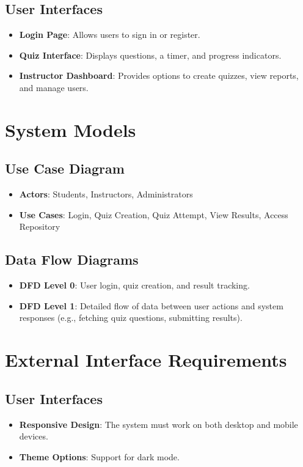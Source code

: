 \documentclass{article}
\begin{document}
	\subsection{User Interfaces}
	\begin{itemize}
		\item \textbf{Login Page}: Allows users to sign in or register.
		\item \textbf{Quiz Interface}: Displays questions, a timer, and progress indicators.
		\item \textbf{Instructor Dashboard}: Provides options to create quizzes, view reports, and manage users.
	\end{itemize}
	
	\section{System Models}
	
	\subsection{Use Case Diagram}
	\begin{itemize}
		\item \textbf{Actors}: Students, Instructors, Administrators
		\item \textbf{Use Cases}: Login, Quiz Creation, Quiz Attempt, View Results, Access Repository
	\end{itemize}
	
	\subsection{Data Flow Diagrams}
	\begin{itemize}
		\item \textbf{DFD Level 0}: User login, quiz creation, and result tracking.
		\item \textbf{DFD Level 1}: Detailed flow of data between user actions and system responses (e.g., fetching quiz questions, submitting results).
	\end{itemize}
	
	\section{External Interface Requirements}
	
	\subsection{User Interfaces}
	\begin{itemize}
		\item \textbf{Responsive Design}: The system must work on both desktop and mobile devices.
		\item \textbf{Theme Options}: Support for dark mode.
	\end{itemize}
	
\end{document}
